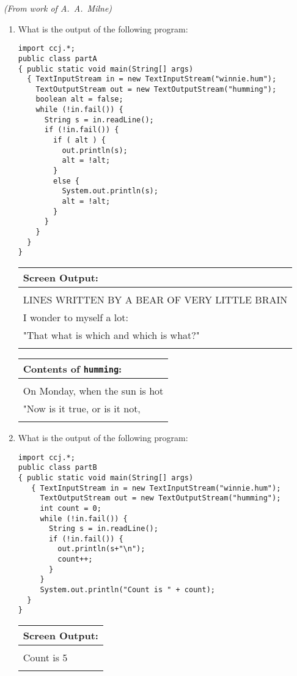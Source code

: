 \begin{enumerate}
{\em (From work of A.~A.~Milne)}

	\begin{enumerate}

	    \item What is the output of the following program:
\begin{verbatim}
import ccj.*;
public class partA
{ public static void main(String[] args)
  { TextInputStream in = new TextInputStream("winnie.hum");
    TextOutputStream out = new TextOutputStream("humming");
    boolean alt = false;
    while (!in.fail()) {  
      String s = in.readLine();
      if (!in.fail()) {
        if ( alt ) {
          out.println(s);
          alt = !alt;
        }
        else {
          System.out.println(s);
          alt = !alt;
        }
      }
    }
  }
}
\end{verbatim}
        	\begin{tabular}{|l|}
		\hline
        	{\bf Screen Output:}\\
            	\hline
            	\\
LINES WRITTEN BY A BEAR OF VERY LITTLE BRAIN \\
I wonder to myself a lot: \\
"That what is which and which is what?" \\
            	\\
            	\hline
        	\end{tabular}

        	\begin{tabular}{|l|}
            	\hline
        	{\bf Contents of {\tt humming}:}\\
            	\hline
            	\\
On Monday, when the sun is hot \\
"Now is it true, or is it not, \\
            	\\
            	\hline
        	\end{tabular}

	    \item What is the output of the following program:
\begin{verbatim}
import ccj.*;
public class partB
{ public static void main(String[] args)
   { TextInputStream in = new TextInputStream("winnie.hum");
     TextOutputStream out = new TextOutputStream("humming");
     int count = 0;
     while (!in.fail()) {  
       String s = in.readLine();
       if (!in.fail()) {
         out.println(s+"\n");
         count++;
       }
     }
     System.out.println("Count is " + count);
  }
}
\end{verbatim}
        	\begin{tabular}{|l|}
            	\hline
        	{\bf Screen Output:}\\
            	\hline
            	\\
Count is 5 \\
            	\\
            	\hline
        	\end{tabular}


\end{enumerate}
\end{enumerate}
